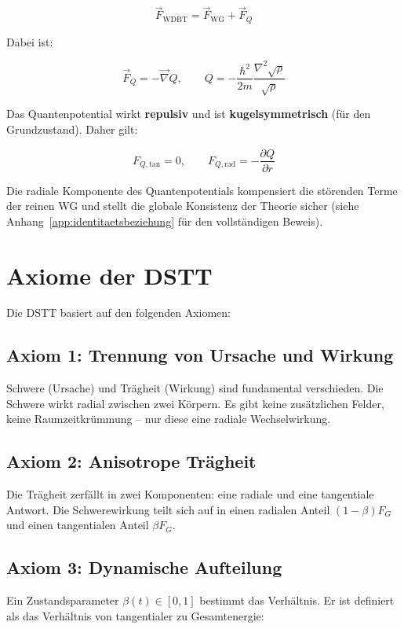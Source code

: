 \[
\boxed{\vec{F}_{\text{WDBT}} = \vec{F}_{\text{WG}} + \vec{F}_Q}
\]

Dabei ist:

\[
\vec{F}_Q = -\vec{\nabla}Q, \qquad 
Q = -\frac{\hbar^2}{2m} \frac{\nabla^2 \sqrt{\rho}}{\sqrt{\rho}}
\]

Das Quantenpotential wirkt \textbf{repulsiv} und ist \textbf{kugelsymmetrisch} (für den Grundzustand). Daher gilt:

\[
F_{Q,\text{tan}} = 0, \qquad F_{Q,\text{rad}} = -\frac{\partial Q}{\partial r}
\]

Die radiale Komponente des Quantenpotentials kompensiert die störenden Terme der reinen WG und stellt die globale Konsistenz der Theorie sicher (siehe Anhang~\ref{app:identitaetsbeziehung} für den vollständigen Beweis).

\section{Axiome der DSTT}
\label{sec:dstt_axiome}

Die DSTT basiert auf den folgenden Axiomen:

\subsection{Axiom 1: Trennung von Ursache und Wirkung}
\label{sub:dstt_axiom1}

Schwere (Ursache) und Trägheit (Wirkung) sind fundamental verschieden. Die Schwere wirkt radial zwischen zwei Körpern. Es gibt keine zusätzlichen Felder, keine Raumzeitkrümmung – nur diese eine radiale Wechselwirkung.

\subsection{Axiom 2: Anisotrope Trägheit}
\label{sub:dstt_axiom2}

Die Trägheit zerfällt in zwei Komponenten: eine radiale und eine tangentiale Antwort. Die Schwerewirkung teilt sich auf in einen radialen Anteil \((1-\beta)F_G\) und einen tangentialen Anteil \(\beta F_G\).

\subsection{Axiom 3: Dynamische Aufteilung}
\label{sub:dstt_axiom3}

Ein Zustandsparameter \(\beta(t) \in [0,1]\) bestimmt das Verhältnis. Er ist definiert als das Verhältnis von tangentialer zu Gesamtenergie:

